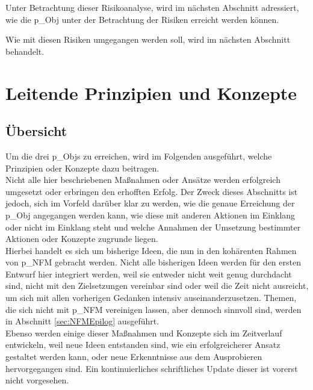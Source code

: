 Unter Betrachtung dieser Risikoanalyse, wird im nächsten Abschnitt adressiert, wie die \gls{p_Obj} unter der Betrachtung der Risiken erreicht werden können.

Wie mit diesen Risiken umgegangen werden soll, wird im nächsten Abschnitt behandelt.

\section{Leitende Prinzipien und Konzepte}\label{sec:Erreichung}
\subsection{Übersicht}
Um die drei \glspl{p_Obj} zu erreichen, wird im Folgenden ausgeführt, welche Prinzipien oder Konzepte dazu beitragen.\\


Nicht alle hier beschriebenen Maßnahmen oder Ansätze werden erfolgreich umgesetzt oder erbringen den erhofften Erfolg. Der Zweck dieses Abschnitts ist jedoch, sich im Vorfeld darüber klar zu werden, wie die genaue Erreichung der \gls{p_Obj} angegangen werden kann, wie diese mit anderen Aktionen im Einklang oder nicht im Einklang steht und welche Annahmen der Umsetzung bestimmter Aktionen oder Konzepte zugrunde liegen.\\


Hierbei handelt es sich um bisherige Ideen, die nun in den kohärenten Rahmen von \gls{p_NFM} gebracht werden. Nicht alle bisherigen Ideen werden für den ersten Entwurf hier integriert werden, weil sie entweder nicht weit genug durchdacht sind, nicht mit den Zielsetzungen vereinbar sind oder weil die Zeit nicht ausreicht, um sich mit allen vorherigen Gedanken intensiv auseinanderzusetzen. Themen, die sich nicht mit \gls{p_NFM} vereinigen lassen, aber dennoch sinnvoll sind, werden in Abschnitt \ref{sec:NFMEpilog} ausgeführt.\\


Ebenso werden einige dieser Maßnahmen und Konzepte sich im Zeitverlauf entwickeln, weil neue Ideen entstanden sind, wie ein erfolgreicherer Ansatz gestaltet werden kann, oder neue Erkenntnisse aus dem Ausprobieren hervorgegangen sind. Ein kontinuierliches schriftliches Update dieser ist vorerst nicht vorgesehen.


